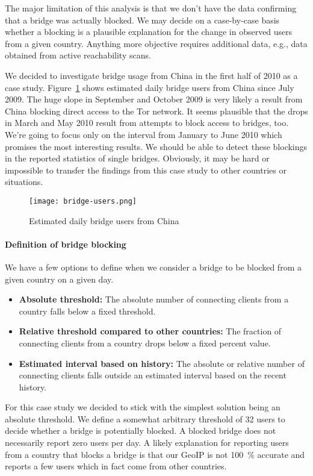 \documentclass{article}
\begin{document}
The major limitation of this analysis is that we don't have the data
confirming that a bridge was actually blocked.
We may decide on a case-by-case basis whether a blocking is a plausible
explanation for the change in observed users from a given country.
Anything more objective requires additional data, e.g., data obtained from
active reachability scans.

We decided to investigate bridge usage from China in the first half of
2010 as a case study.
Figure~\ref{fig:bridge-users} shows estimated daily bridge users from China
since July 2009.
The huge slope in September and October 2009 is very likely a result from
China blocking direct access to the Tor network.
It seems plausible that the drops in March and May 2010 result from
attempts to block access to bridges, too.
We're going to focus only on the interval from January to June 2010 which
promises the most interesting results.
We should be able to detect these blockings in the reported statistics of
single bridges.
Obviously, it may be hard or impossible to transfer the findings from this
case study to other countries or situations.

\begin{figure}
\texttt{[image: bridge-users.png]}
\caption{Estimated daily bridge users from China}
\label{fig:bridge-users}
\end{figure}

\paragraph{Definition of bridge blocking}

We have a few options to define when we consider a bridge to be blocked
from a given country on a given day.

\begin{itemize}
\item \textbf{Absolute threshold:}
The absolute number of connecting clients from a country falls below a
fixed threshold.
\item \textbf{Relative threshold compared to other countries:}
The fraction of connecting clients from a country drops below a fixed
percent value.
\item \textbf{Estimated interval based on history:}
The absolute or relative number of connecting clients falls outside an
estimated interval based on the recent history.
\end{itemize}

For this case study we decided to stick with the simplest solution being
an absolute threshold.
We define a somewhat arbitrary threshold of 32 users to decide whether a
bridge is potentially blocked.
A blocked bridge does not necessarily report zero users per day.
A likely explanation for reporting users from a country that blocks a
bridge is that our GeoIP is not 100~\% accurate and reports a few users
which in fact come from other countries.
\end{document}

